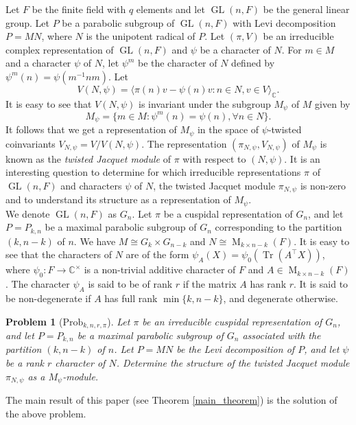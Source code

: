 \documentclass[reqno]{amsart}
\newtheorem*{problem}{Problem}
\theoremstyle{definition}
\theoremstyle{remark}
\numberwithin{equation}{section}
\newcommand{\bC}{\mathbb C} \newcommand{\bF}{\mathbb F}
\DeclareMathOperator{\GL}{GL}
\DeclareMathOperator{\M}{M}
\DeclareMathOperator{\tr}{Tr}
\begin{document}
Let $F$ be the finite field with $q$ elements and let $\GL(n,F)$ be the  general linear group. Let $P$ be a parabolic subgroup of $\GL(n,F)$ with Levi decomposition $P=MN$, where $N$ is the unipotent radical of $P$. Let $(\pi,V)$ be an irreducible complex  representation of $\GL(n,F)$ and $\psi$ be a character of $N$. For $m \in M$ and a character $\psi$ of $N$, let $\psi^{m}$ be the character of $N$ defined by $\psi^{m}(n)=\psi(m^{-1}nm)$. Let 
\[V(N,\psi)= \langle \pi(n)v-\psi(n)v \colon n \in N, v \in V \rangle_{\mathbb{C}}.\]  
It is easy to see that $V(N, \psi)$ is invariant under the subgroup $M_\psi$ of $M$ given by 
\[M_{\psi} = \{m \in M \colon {\psi}^{m}(n)=\psi(n) , \forall n \in N \}.\] It follows that we get a representation of $M_{\psi}$ in the space of $\psi$-twisted coinvariants $V_{N,\psi}=V/V(N,\psi)$. 
The representation $(\pi_{N,\psi}, V_{N,\psi})$ of $M_\psi$ is known as the \emph{twisted Jacquet module} of $\pi$ with respect to $(N,\psi)$.  It is an interesting question to determine for which irreducible representations $\pi$ of $\GL(n,F)$ and characters $\psi$ of $N$, the twisted Jacquet module $\pi_{N,\psi}$ is non-zero and to understand its structure as a representation of $M_{\psi}$.\\

We denote  $\GL(n,F)$ as $G_n$. Let $\pi$ be a cuspidal representation of $G_n$, and let $P=P_{k,n}$ be a maximal parabolic subgroup of $G_n$ corresponding to the partition $(k,n-k)$ of $n$. We have $M \cong G_k \times G_{n-k}$ and $N \cong \M_{k \times n-k}(F)$. It is easy to see that the characters of $N$ are of the form $\psi_A(X)=\psi_0(\tr(A^{\top}X))$, where $\psi_0:F \to \bC^\times$ is a non-trivial additive character of $F$ and $A \in \M_{k \times n-k}(F)$. The character $\psi_A$ is said to be of rank $r$ if the matrix $A$ has rank $r$. It is said to be non-degenerate if $A$ has full rank $\min\{k,n-k\}$, and degenerate otherwise. \\

\begin{problem}[$\text{Prob}_{k,n,r,\pi}$] Let $\pi$ be an irreducible cuspidal representation of $G_n$, and let $P=P_{k,n}$ be a maximal parabolic subgroup of $G_n$ associated with the partition $(k,n-k)$ of $n$. Let $P=MN$ be the Levi decomposition of $P$, and let $\psi$ be a rank $r$ character of $N$. Determine the structure of the  twisted Jacquet module $\pi_{N,\psi}$ as a $M_{\psi}$-module.
\end{problem}
\noindent The main result of this paper (see Theorem \ref{main_theorem}) is the solution of the above problem.
\end{document}
